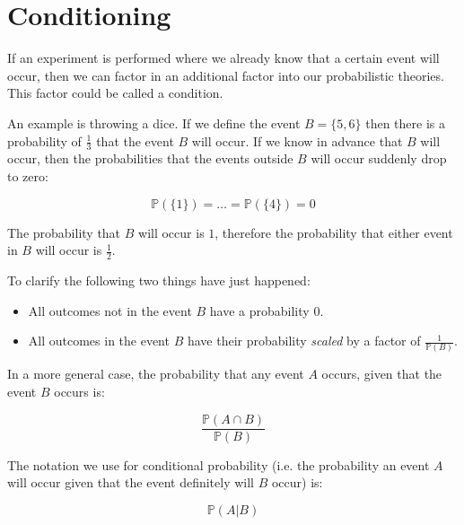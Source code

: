 

\section{Conditioning}

If an experiment is performed where we already know that a certain event will
occur, then we can factor in an additional factor into our probabilistic
theories. This factor could be called a condition.

An example is throwing a dice. If we define the event $B = \{5, 6\}$ then there
is a probability of $\frac{1}{3}$ that the event $B$ will occur. If we know in
advance that $B$ will occur, then the probabilities that the events outside $B$
will occur suddenly drop to zero:

\begin{dmath}
	{\mathbb{P}(\{1\}) = \dots = \mathbb{P}(\{4\}) = 0}
\end{dmath}

The probability that $B$ will occur is $1$, therefore the probability that
either event in $B$ will occur is $\frac{1}{2}$.

To clarify the following two things have just happened:

\begin{itemize}
	\item All outcomes not in the event $B$ have a probability $0$.
	\item All outcomes in the event $B$ have their probability {\it scaled} by a
	factor of $\frac{1}{\mathbb{P}(B)}$.
\end{itemize}

In a more general case, the probability that any event $A$ occurs, given that
the event $B$ occurs is:

\begin{dmath}
	\frac{\mathbb{P}(A \cap B)}{\mathbb{P}(B)}
\end{dmath}

The notation we use for conditional probability (i.e. the probability an event
$A$ will occur given that the event definitely will $B$ occur) is:

\begin{dmath}
	\mathbb{P}(A|B)
\end{dmath}


